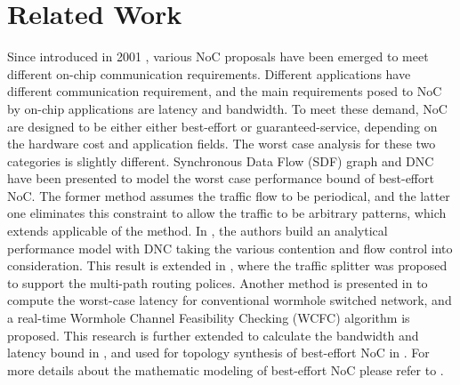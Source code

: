 \documentclass[10pt,journal]{IEEEtran}
\begin{document}
\section{Related Work}\label{related}
Since introduced in 2001 \cite{DaTo01}, various NoC proposals have been emerged to meet different on-chip communication requirements. Different applications have different communication requirement, and the main requirements posed to NoC by on-chip applications are latency and bandwidth. To meet these demand, NoC are designed to be either either best-effort or guaranteed-service, depending on the hardware cost and application fields. The worst case analysis for these two categories is slightly different. Synchronous Data Flow (SDF) graph \cite{poplavko2003task} and DNC \cite{qian2009analysis} have been presented to model the worst case performance bound of best-effort NoC. The former method assumes the traffic flow to be periodical, and the latter one eliminates this constraint to allow the traffic to be arbitrary patterns, which extends applicable of the method. In \cite{qian2009analysis}, the authors build an analytical performance model with DNC taking the various contention and flow control into consideration. This result is extended in \cite{Du:2012:WPA:2380445.2380469}, where the traffic splitter was proposed to support the multi-path routing polices. Another method is presented in \cite{Lee:2003:RWC:846077.846083} to compute the worst-case latency for conventional wormhole switched network, and a real-time Wormhole Channel Feasibility Checking (WCFC) algorithm is proposed. This research is further extended to calculate the bandwidth and latency bound in \cite{6109240}, and used for topology synthesis of best-effort NoC in \cite{EPFL-ARTICLE-186879}. For more details about the mathematic modeling of best-effort NoC please refer to \cite{Kiasari:2013:MFP:2480741.2480755}.
\end{document}
